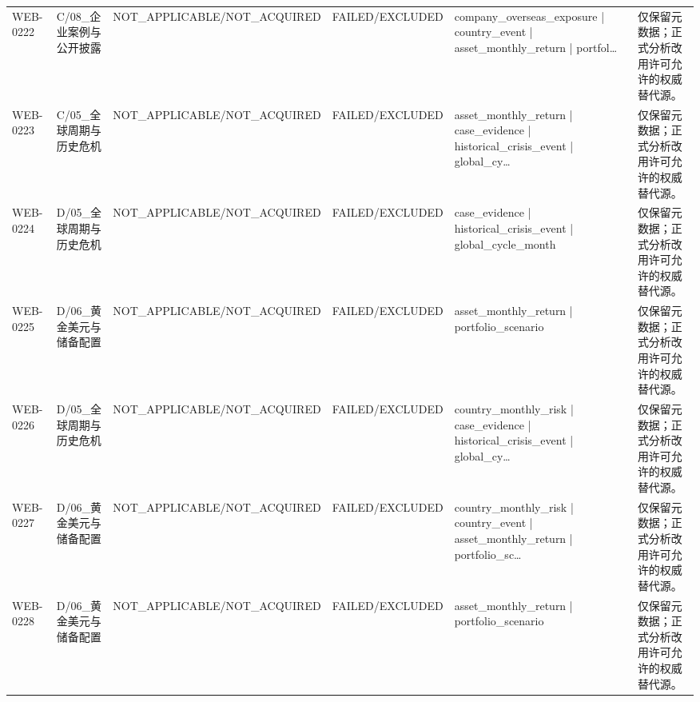 \begin{landscape}
\begin{longtable}{p{1.8cm}p{2.6cm}p{2.6cm}p{2.6cm}p{4.8cm}p{7.2cm}}
WEB-0222 & C/\allowbreak{}08\_\allowbreak{}企业案例与公开披露 & NOT\_\allowbreak{}APPLICABLE/\allowbreak{}NOT\_\allowbreak{}ACQUIRED & FAILED/\allowbreak{}EXCLUDED & company\_\allowbreak{}overseas\_\allowbreak{}exposure | country\_\allowbreak{}event | asset\_\allowbreak{}monthly\_\allowbreak{}return | portfol… & 仅保留元数据；正式分析改用许可允许的权威替代源。\\
WEB-0223 & C/\allowbreak{}05\_\allowbreak{}全球周期与历史危机 & NOT\_\allowbreak{}APPLICABLE/\allowbreak{}NOT\_\allowbreak{}ACQUIRED & FAILED/\allowbreak{}EXCLUDED & asset\_\allowbreak{}monthly\_\allowbreak{}return | case\_\allowbreak{}evidence | historical\_\allowbreak{}crisis\_\allowbreak{}event | global\_\allowbreak{}cy… & 仅保留元数据；正式分析改用许可允许的权威替代源。\\
WEB-0224 & D/\allowbreak{}05\_\allowbreak{}全球周期与历史危机 & NOT\_\allowbreak{}APPLICABLE/\allowbreak{}NOT\_\allowbreak{}ACQUIRED & FAILED/\allowbreak{}EXCLUDED & case\_\allowbreak{}evidence | historical\_\allowbreak{}crisis\_\allowbreak{}event | global\_\allowbreak{}cycle\_\allowbreak{}month & 仅保留元数据；正式分析改用许可允许的权威替代源。\\
WEB-0225 & D/\allowbreak{}06\_\allowbreak{}黄金美元与储备配置 & NOT\_\allowbreak{}APPLICABLE/\allowbreak{}NOT\_\allowbreak{}ACQUIRED & FAILED/\allowbreak{}EXCLUDED & asset\_\allowbreak{}monthly\_\allowbreak{}return | portfolio\_\allowbreak{}scenario & 仅保留元数据；正式分析改用许可允许的权威替代源。\\
WEB-0226 & D/\allowbreak{}05\_\allowbreak{}全球周期与历史危机 & NOT\_\allowbreak{}APPLICABLE/\allowbreak{}NOT\_\allowbreak{}ACQUIRED & FAILED/\allowbreak{}EXCLUDED & country\_\allowbreak{}monthly\_\allowbreak{}risk | case\_\allowbreak{}evidence | historical\_\allowbreak{}crisis\_\allowbreak{}event | global\_\allowbreak{}cy… & 仅保留元数据；正式分析改用许可允许的权威替代源。\\
WEB-0227 & D/\allowbreak{}06\_\allowbreak{}黄金美元与储备配置 & NOT\_\allowbreak{}APPLICABLE/\allowbreak{}NOT\_\allowbreak{}ACQUIRED & FAILED/\allowbreak{}EXCLUDED & country\_\allowbreak{}monthly\_\allowbreak{}risk | country\_\allowbreak{}event | asset\_\allowbreak{}monthly\_\allowbreak{}return | portfolio\_\allowbreak{}sc… & 仅保留元数据；正式分析改用许可允许的权威替代源。\\
WEB-0228 & D/\allowbreak{}06\_\allowbreak{}黄金美元与储备配置 & NOT\_\allowbreak{}APPLICABLE/\allowbreak{}NOT\_\allowbreak{}ACQUIRED & FAILED/\allowbreak{}EXCLUDED & asset\_\allowbreak{}monthly\_\allowbreak{}return | portfolio\_\allowbreak{}scenario & 仅保留元数据；正式分析改用许可允许的权威替代源。\\

\end{longtable}
\end{landscape}
